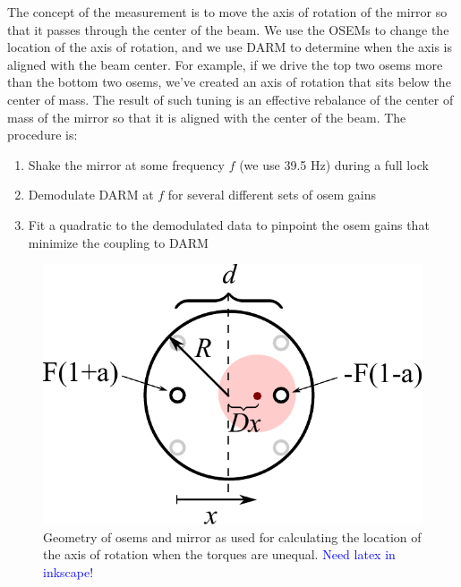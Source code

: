 The concept of the measurement is to move the axis of rotation of the
mirror so that it passes through the center of the beam. We use the
OSEMs to change the location of the axis of rotation, and we use DARM
to determine when the axis is aligned with the beam center. For
example, if we drive the top two osems more than the bottom two osems,
we've created an axis of rotation that sits below the center of
mass. The result of such tuning is an effective rebalance of the
center of mass of the mirror so that it is aligned with the center of
the beam. The procedure is:
\begin{enumerate}
\item Shake the mirror at some frequency $f$ (we use
39.5 Hz) during a full lock \vspace{-10pt}
\item Demodulate DARM at $f$ for several different sets of osem gains \vspace{-10pt}
\item Fit a quadratic to the demodulated data to pinpoint the osem gains that
  minimize the coupling to DARM
\end{enumerate}

\begin{figure}
\begin{centering}
\includegraphics[width=0.5\columnwidth]{figures/geometry_mirror_osems.pdf}
\caption[Diagram of mirror and osem geometry]{Geometry of osems and
  mirror as used for calculating the location of the axis of rotation
  when the torques are unequal. \textcolor{blue}{Need latex in
    inkscape!}}
\label{fig:mirror_osem_geometry}
\end{centering}
\end{figure}

